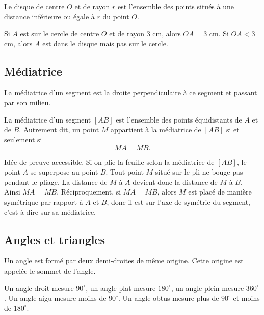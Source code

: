 \documentclass[11pt,a4paper]{article}
\begin{document}
\begin{definitionbox}
Le disque de centre \(O\) et de rayon \(r\) est l'ensemble des points situés à une distance inférieure ou égale à \(r\) du point \(O\).
\end{definitionbox}

\begin{retenirbox}
Si \(A\) est sur le cercle de centre \(O\) et de rayon 3 cm, alors \(OA=3\) cm. Si \(OA<3\) cm, alors \(A\) est dans le disque mais pas sur le cercle.
\end{retenirbox}

\subsection{Médiatrice}

\begin{definitionbox}
La médiatrice d'un segment est la droite perpendiculaire à ce segment et passant par son milieu.
\end{definitionbox}

\begin{theobox}
La médiatrice d'un segment \([AB]\) est l'ensemble des points équidistants de \(A\) et de \(B\). Autrement dit, un point \(M\) appartient à la médiatrice de \([AB]\) si et seulement si
\[
MA=MB.
\]
\end{theobox}

\begin{preuvebox}
Idée de preuve accessible. Si on plie la feuille selon la médiatrice de \([AB]\), le point \(A\) se superpose au point \(B\). Tout point \(M\) situé sur le pli ne bouge pas pendant le pliage. La distance de \(M\) à \(A\) devient donc la distance de \(M\) à \(B\). Ainsi \(MA=MB\). Réciproquement, si \(MA=MB\), alors \(M\) est placé de manière symétrique par rapport à \(A\) et \(B\), donc il est sur l'axe de symétrie du segment, c'est-à-dire sur sa médiatrice.
\end{preuvebox}

\subsection{Angles et triangles}

\begin{definitionbox}
Un angle est formé par deux demi-droites de même origine. Cette origine est appelée le sommet de l'angle.
\end{definitionbox}

\begin{retenirbox}
Un angle droit mesure \(90^\circ\), un angle plat mesure \(180^\circ\), un angle plein mesure \(360^\circ\). Un angle aigu mesure moins de \(90^\circ\). Un angle obtus mesure plus de \(90^\circ\) et moins de \(180^\circ\).
\end{retenirbox}
\end{document}
